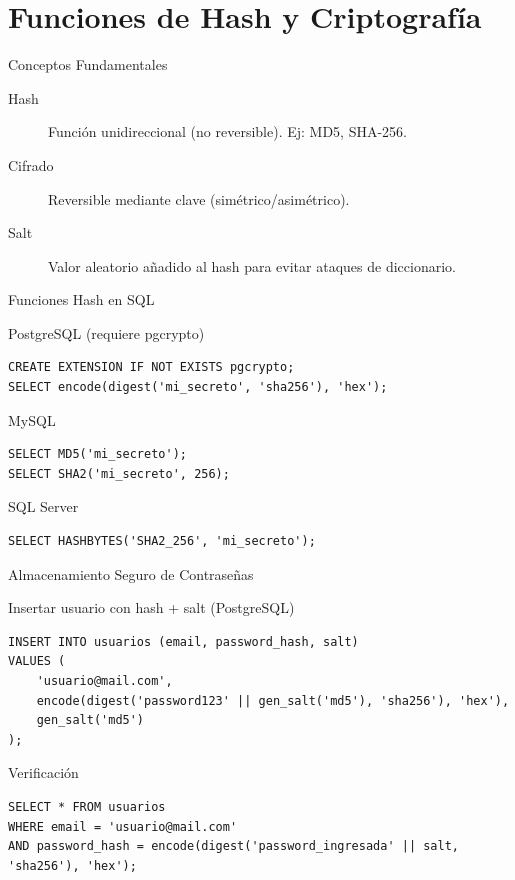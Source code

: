 \documentclass[aspectratio=169, 10pt, xcolor=table]{beamer}
\begin{document}
\section{Funciones de Hash y Criptografía}

\begin{frame}{Conceptos Fundamentales}
    \begin{description}
        \item[Hash] Función unidireccional (no reversible). Ej: MD5, SHA-256.
        \item[Cifrado] Reversible mediante clave (simétrico/asimétrico).
        \item[Salt] Valor aleatorio añadido al hash para evitar ataques de diccionario.
    \end{description}
\end{frame}

\begin{frame}[fragile]{Funciones Hash en SQL}
    \begin{block}{PostgreSQL (requiere pgcrypto)}
        \begin{lstlisting}
CREATE EXTENSION IF NOT EXISTS pgcrypto;
SELECT encode(digest('mi_secreto', 'sha256'), 'hex');
        \end{lstlisting}
    \end{block}
    \begin{block}{MySQL}
        \begin{lstlisting}
SELECT MD5('mi_secreto');
SELECT SHA2('mi_secreto', 256);
        \end{lstlisting}
    \end{block}
    \begin{block}{SQL Server}
        \begin{lstlisting}
SELECT HASHBYTES('SHA2_256', 'mi_secreto');
        \end{lstlisting}
    \end{block}
\end{frame}

\begin{frame}[fragile]{Almacenamiento Seguro de Contraseñas}
    \begin{block}{Insertar usuario con hash + salt (PostgreSQL)}
        \begin{lstlisting}
INSERT INTO usuarios (email, password_hash, salt)
VALUES (
    'usuario@mail.com',
    encode(digest('password123' || gen_salt('md5'), 'sha256'), 'hex'),
    gen_salt('md5')
);
        \end{lstlisting}
    \end{block}
    \begin{block}{Verificación}
        \begin{lstlisting}
SELECT * FROM usuarios
WHERE email = 'usuario@mail.com'
AND password_hash = encode(digest('password_ingresada' || salt, 'sha256'), 'hex');
        \end{lstlisting}
    \end{block}
\end{frame}
\end{document}
